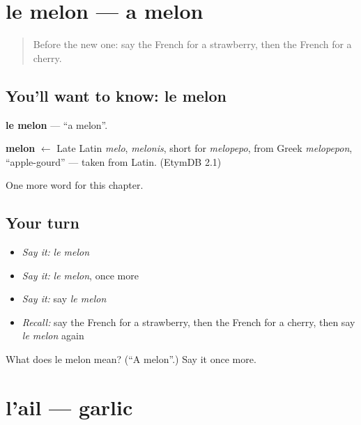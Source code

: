 \section[le melon]{le melon — a melon}

\label{lesson:FR-C120-melon}



\begin{quote}
Before the new one: say the French for a strawberry, then the French for a cherry.
\end{quote}

\subsection*{You'll want to know: le melon}
\textbf{le melon} — \textquotedblleft{}a melon\textquotedblright{}.

\begin{cousinweb}
\textbf{melon} $\leftarrow$ Late Latin \emph{melo}, \emph{melonis}, short for \emph{melopepo}, from Greek \emph{melopepon}, \textquotedblleft{}apple-gourd\textquotedblright{} — taken from Latin. (EtymDB 2.1)
\end{cousinweb}

\begin{grammarlens}[title={What you've built}]
One more word for this chapter.
\end{grammarlens}

\subsection*{Your turn}
\begin{itemize}
\raggedright
  \item \emph{Say it:} \emph{le melon}
  \item \emph{Say it:} \emph{le melon}, once more
  \item \emph{Say it:} say \emph{le melon}
  \item \emph{Recall:} say the French for a strawberry, then the French for a cherry, then say \emph{le melon} again
\end{itemize}

\begin{tcolorbox}[breakable,colback=teal!4,colframe=teal!35!black,title={Before you move on}]
What does le melon mean? (\textquotedblleft{}A melon\textquotedblright{}.) Say it once more.
\end{tcolorbox}
\section[l'ail]{l'ail — garlic}


